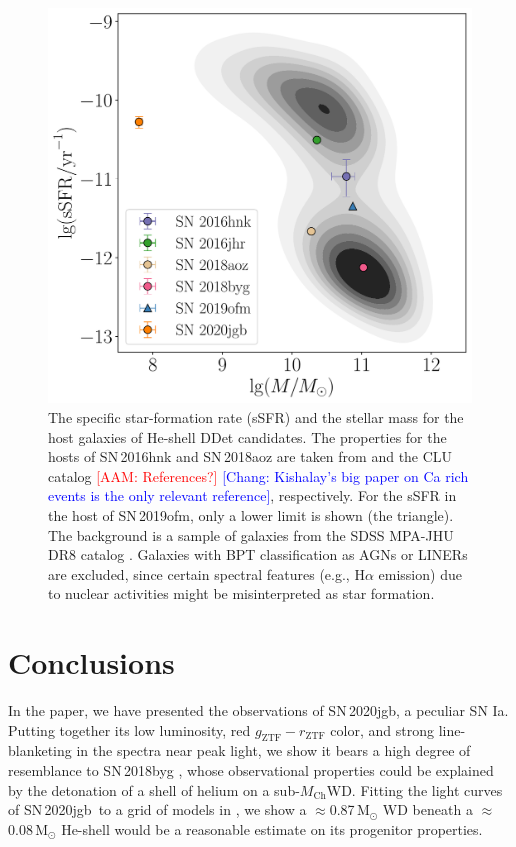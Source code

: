 \documentclass[twocolumn]{aastex631}
\newcommand{\sn}{SN\,2020jgb}
\newcommand{\Mch}{$M_\mathrm{Ch}$}
\newcommand{\adam}[1]{\textcolor{red}{[AAM: #1]}}
\newcommand{\chang}[1]{\textcolor{blue}{[Chang: #1]}}
\begin{document}
\begin{figure}
    \centering
    \includegraphics[width=\linewidth]{host.pdf}
    \caption{The specific star-formation rate (sSFR) and the stellar mass for the host galaxies of He-shell DDet candidates. The properties for the hosts of SN\,2016hnk and SN\,2018aoz are taken from \citet{Dong_Ca-rich_2022} and the CLU catalog \adam{References?} \chang{Kishalay's big paper on Ca rich events is the only relevant reference}, respectively. For the sSFR in the host of SN\,2019ofm, only a lower limit is shown (the triangle). The background is a sample of galaxies from the SDSS MPA-JHU DR8 catalog \citep{Kauffmann_SDSS_2003,Brinchmann_SDSS_2004}. Galaxies with BPT classification as AGNs or LINERs are excluded, since certain spectral features (e.g., H$\alpha$ emission) due to nuclear activities might be misinterpreted as star formation.}
    \label{fig:host}
\end{figure}

\section{Conclusions} \label{sec:conclusion}
In the paper, we have presented the observations of \sn, a peculiar SN Ia. Putting together its low luminosity, red $g_\mathrm{ZTF}-r_\mathrm{ZTF}$ color, and strong line-blanketing in the spectra near peak light, we show it bears a high degree of resemblance to SN\,2018byg \citep{de_18byg_2019}, whose observational properties could be explained by the detonation of a shell of helium on a sub-\Mch WD. Fitting the light curves of \sn\ to a grid of models in \citet{polin_observational_2019}, we show a $\approx$0.87\,$\mathrm{M_\odot}$ WD beneath a $\approx$0.08\,$\mathrm{M_\odot}$ He-shell would be a reasonable estimate on its progenitor properties.
\end{document}
